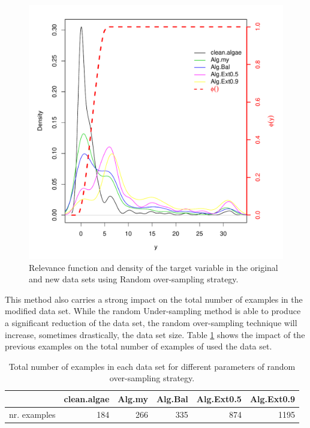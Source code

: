 \documentclass[10pt,a4paper]{article}\usepackage[]{graphicx}\usepackage[]{color}
\makeatletter
\def\maxwidth{ %
  \ifdim\Gin@nat@width>\linewidth
    \linewidth
  \else
    \Gin@nat@width
  \fi
}
\newenvironment{knitrout}{}{} %
\makeatother
\begin{document}
\begin{knitrout}\footnotesize
{}\color{fgcolor}\begin{figure}

{\centering \includegraphics[width=\maxwidth]{figures/UBL-RO_ex1-1} 

}

\caption[Relevance function and density of the target variable in the original and new data sets using Random over-sampling strategy]{Relevance function and density of the target variable in the original and new data sets using Random over-sampling strategy.}\label{fig:RO_ex1}
\end{figure}


\end{knitrout}

This method also carries a strong impact on the total number of examples in the modified data set. While the random Under-sampling method is able to produce a significant reduction of the data set, the random over-sampling technique will increase, sometimes drastically, the data set size. Table \ref{tab:ROReg_table} shows the impact of the previous examples on the total number of examples of used the data set.

\begin{table}[ht]
\centering
\begin{tabular}{rrrrrr}
  \hline
 & clean.algae & Alg.my & Alg.Bal & Alg.Ext0.5 & Alg.Ext0.9 \\ 
  \hline
nr. examples & 184 & 266 & 335 & 874 & 1195 \\ 
   \hline
\end{tabular}
\caption{Total number of examples in each data set for different parameters of random over-sampling strategy.} 
\label{tab:ROReg_table}
\end{table}
\end{document}
